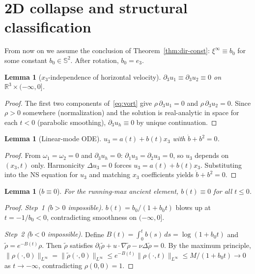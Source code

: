 \documentclass[12pt, reqno]{amsart}
\newtheorem{lemma}[theorem]{Lemma}
\theoremstyle{definition}
\theoremstyle{remark}
\numberwithin{equation}{section}
\newcommand{\R}{\mathbb{R}}
\newcommand{\Sbb}{\mathbb{S}}
\newcommand{\step}[1]{\par\medskip\noindent\textit{Step~#1.}\enspace}
\begin{document}
\section{2D collapse and structural classification}%
\label{sec:collapse}

From now on we assume the conclusion of Theorem~\ref{thm:dir-const}:
$\xi^\infty\equiv b_0$ for some constant $b_0\in\Sbb^2$.
After rotation, $b_0=e_3$.

\begin{lemma}[$x_3$-independence of horizontal velocity]\label{lem:x3-indep}
$\partial_3 u_1\equiv\partial_3 u_2\equiv 0$ on $\R^3\times(-\infty,0]$.
\end{lemma}
\begin{proof}
The first two components of~\eqref{eq:vort} give
$\rho\,\partial_3 u_1=0$ and $\rho\,\partial_3 u_2=0$.
Since $\rho>0$ somewhere (normalization) and the solution is
real-analytic in space for each $t<0$ (parabolic smoothing),
$\partial_3 u_h\equiv 0$ by unique continuation.
\end{proof}

\begin{lemma}[Linear-mode ODE]\label{lem:ODE}
$u_3=a(t)+b(t)x_3$ with $\dot b+b^2=0$.
\end{lemma}
\begin{proof}
From $\omega_1=\omega_2=0$ and $\partial_3 u_h=0$:
$\partial_1 u_3=\partial_2 u_3=0$, so $u_3$ depends on $(x_3,t)$ only.
Harmonicity $\Delta u_3=0$ forces $u_3=a(t)+b(t)x_3$.
Substituting into the NS equation for $u_3$ and matching $x_3$
coefficients yields $\dot b+b^2=0$.
\end{proof}

\begin{lemma}[$b\equiv 0$]\label{lem:b-zero}
For the running-max ancient element, $b(t)\equiv 0$ for all $t\le 0$.
\end{lemma}
\begin{proof}
\step{1 ($b>0$ impossible)}
$b(t)=b_0/(1+b_0 t)$ blows up at $t=-1/b_0<0$, contradicting
smoothness on $(-\infty,0]$.

\step{2 ($b<0$ impossible)}
Define $B(t)=\int_0^t b(s)\,ds=\log(1+b_0 t)$ and
$\tilde\rho=e^{-B(t)}\rho$.  Then $\tilde\rho$ satisfies
$\partial_t\tilde\rho+u\cdot\nabla\tilde\rho-\nu\Delta\tilde\rho=0$.
By the maximum principle,
$\|\rho(\cdot,0)\|_{L^\infty}=\|\tilde\rho(\cdot,0)\|_{L^\infty}
\le e^{-B(t)}\|\rho(\cdot,t)\|_{L^\infty}\le M/(1+b_0 t)\to 0$
as $t\to-\infty$, contradicting $\rho(0,0)=1$.
\end{proof}
\end{document}
